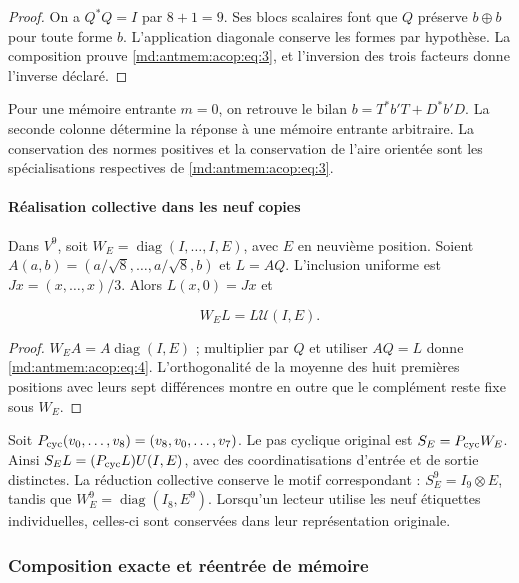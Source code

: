 \begin{proof}
On a \(Q^*Q=I\) par \(8+1=9\). Ses blocs scalaires font que \(Q\) préserve \(b\oplus b\) pour toute forme \(b\). L’application diagonale conserve les formes par hypothèse. La composition prouve \eqref{md:antmem:acop:eq:3}, et l’inversion des trois facteurs donne l’inverse déclaré.
\end{proof}

Pour une mémoire entrante \(m=0\), on retrouve le bilan \(b=T^*b'T+D^*b'D\). La seconde colonne détermine la réponse à une mémoire entrante arbitraire. La conservation des normes positives et la conservation de l’aire orientée sont les spécialisations respectives de \eqref{md:antmem:acop:eq:3}.

\paragraph{Réalisation collective dans les neuf copies
}

Dans \(V^9\), soit \(W_E=\operatorname{diag}(I,\ldots,I,E)\), avec \(E\) en neuvième position. Soient \(A(a,b)=(a/\sqrt8,\ldots,a/\sqrt8,b)\) et \(L=AQ\). L’inclusion uniforme est \(Jx=(x,\ldots,x)/3\). Alors \(L(x,0)=Jx\) et

\begin{equation}
W_E L=L\mathcal U(I,E).
\label{md:antmem:acop:eq:4}
\end{equation}

\begin{proof}
\(W_EA=A\operatorname{diag}(I,E)\) ; multiplier par \(Q\) et utiliser \(AQ=L\) donne \eqref{md:antmem:acop:eq:4}. L’orthogonalité de la moyenne des huit premières positions avec leurs sept différences montre en outre que le complément reste fixe sous \(W_E\).
\end{proof}

Soit \(P_{\rm cyc}(v_0,\ldots,v_8)=(v_8,v_0,\ldots,v_7)\). Le pas cyclique original est \(S_E=P_{\rm cyc}W_E\). Ainsi \(S_EL=(P_{\rm cyc}L)U(I,E)\), avec des coordinatisations d’entrée et de sortie distinctes. La réduction collective conserve le motif correspondant : \(S_E^9=I_9\otimes E\), tandis que \(W_E^9=\operatorname{diag}(I_8,E^9)\). Lorsqu’un lecteur utilise les neuf étiquettes individuelles, celles-ci sont conservées dans leur représentation originale.

\subsubsection{Composition exacte et réentrée de mémoire
}

